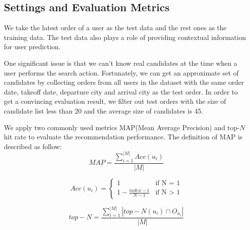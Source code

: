 \documentclass{llncs}
\begin{document}
\subsection{Settings and Evaluation Metrics}
We take the latest order of a user as the test data and the rest ones as the training data. The test data also plays a role of providing contextual information for user prediction.\par
One significant issue is that we can't know real candidates at the time when a user performs the search action. Fortunately, we can get an approximate set of candidates by collecting orders from all users in the dataset with the same order date, takeoff date, departure city and arrival city as the test order. In order to get a convincing evaluation result, we filter out test orders with the size of candidate list less than 20 and the average size of candidates is 45.\par
We apply two commonly used metrics MAP(Mean Average Precision) and top-$N$ hit rate to evaluate the recommendation performance. The definition of MAP is described as follow:\\
\begin{equation}
MAP = \frac{\sum_{i=1}^{|M|}Acc(u_i)}{|M|}
\end{equation}

\begin{equation}
Acc(u_i) =
\begin{cases}
1 & \mbox{if N = 1}\\
1 - \frac{index-1}{N-1} & \mbox{if N $>$ 1}
\end{cases}
\end{equation}

\begin{equation}
top-N = \frac{\sum_{i=1}^{|M|}|top-N(u_i) \cap O_{u_i}|}{|M|}
\end{equation}
\end{document}
